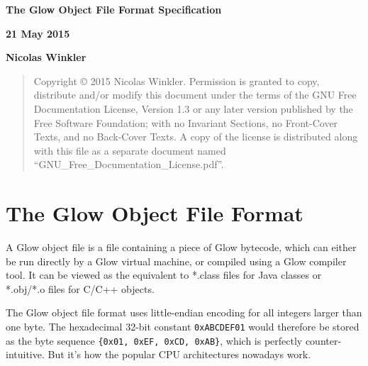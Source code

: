 \documentclass[12pt]{article}
\begin{document}
\begin{titlepage}
    \begin{center}
        \vspace*{1cm}
        {
            \Huge        
            \textbf{The Glow Object File Format Specification}
        }

        \vspace{0.7cm}
        
        
        \vspace{0.5cm}
        { \large
        \textbf{21 May 2015}}

        \vspace{1cm}

        { \Large
        \textbf{Nicolas Winkler}
        }
        \vfill

\bigskip
\begin{quote}
    Copyright \copyright{} 2015 Nicolas Winkler.
    Permission is granted to copy, distribute and/or modify this document
    under the terms of the GNU Free Documentation License, Version 1.3
    or any later version published by the Free Software Foundation;
    with no Invariant Sections, no Front-Cover Texts, and no Back-Cover Texts.
    A copy of the license is distributed along with this file as a separate document 
    named ``GNU\_Free\_Documentation\_License.pdf''.
\end{quote}
\bigskip

        \vspace{1cm}
        
    \end{center}
\end{titlepage}

\setlength{\parindent}{0cm}
\setlength{\parskip}{0.2cm}

\section*{The Glow Object File Format}

A Glow object file is a file containing a piece of Glow bytecode, which
can either be run directly by a Glow virtual machine, or compiled using
a Glow compiler tool.
It can be viewed as the equivalent to *.class files for Java classes or
*.obj/*.o files for C/C++ objects.



The Glow object file format uses little-endian encoding for all integers
larger than one byte. The hexadecimal 32-bit constant \texttt{0xABCDEF01} would
therefore be stored as the byte sequence \texttt{\{0x01, 0xEF, 0xCD, 0xAB\}},
which is perfectly counter-intuitive. But it's how the popular CPU architectures
nowadays work.
\end{document}
